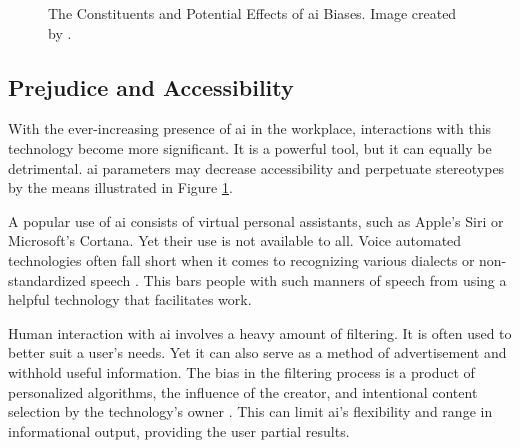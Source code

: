 \documentclass{report}
\begin{document}
\begin{figure}[h]
	\centering

	\caption[Constituents and Effects of \ac{ai} Biases]{
		The Constituents and Potential Effects of \ac{ai} Biases. 
		Image created by .
	}
	\label{fig:constituents}
\end{figure}

\subsection{Prejudice and Accessibility}
With the ever-increasing presence of \ac{ai} in the workplace, interactions with this technology become more significant.
It is a powerful tool, but it can equally be detrimental.
\ac{ai} parameters may decrease accessibility and perpetuate stereotypes by the means illustrated in Figure \ref{fig:constituents}.

A popular use of \ac{ai} consists of virtual personal assistants, such as Apple's Siri or Microsoft's Cortana. 
Yet their use is not available to all. 
Voice automated technologies often fall short when it comes to recognizing various dialects or non-standardized speech \citep{hirayama2015}. 
This bars people with such manners of speech from using a helpful technology that facilitates work. 

Human interaction with \ac{ai} involves a heavy amount of filtering. 
It is often used to better suit a user's needs. 
Yet it can also serve as a method of advertisement and withhold useful information. 
The bias in the filtering process is a product of personalized algorithms, the influence of the creator, and intentional content selection by the technology's owner \citep{bozdag2013}. 
This can limit \ac{ai}'s flexibility and range in informational output, providing the user partial results.
\end{document}
